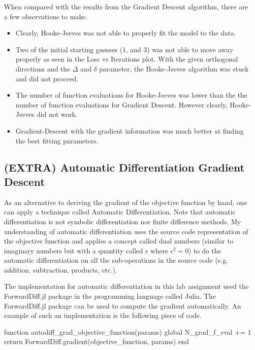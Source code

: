 \documentclass{article}
\begin{document}
    When compared with the results from the Gradient Descent algorithm, there are a few observations to make.
    \begin{itemize}
        \item Clearly, Hooke-Jeeves was not able to properly fit the model to the data.
        \item Two of the initial starting guesses (1, and 3) was not able to move away properly as seen in the Loss vs Iterations plot. With the given orthogonal directions and the $\Delta$ and $\delta$ parameter, the Hooke-Jeeves algorithm was stuck and did not proceed.
        \item The number of function evaluations for Hooke-Jeeves was lower than the the number of function evaluations for Gradient Descent. However clearly, Hooke-Jeeves did not work.
        \item Gradient-Descent with the gradient information was much better at finding the best fitting parameters.
    \end{itemize}

    \subsection{(EXTRA) Automatic Differentiation Gradient Descent}

    As an alternative to deriving the gradient of the objective function by hand, one can apply a technique called Automatic Differentiation. Note that automatic differentiation is not symbolic differentiation nor finite difference methods. My understanding of automatic differentiation uses the source code representation of the objective function and applies a concept called dual numbers (similar to imaginary numbers but with a quantity called $\epsilon$ where $\epsilon^2 = 0$) to do the automatic differentiation on all the sub-operations in the source code (e.g. addition, subtraction, products, etc.).

    The implementation for automatic differentiation in this lab assignment used the ForwardDiff.jl package in the programming language called Julia. The ForwardDiff.jl package can be used to compute the gradient automatically. An example of such an implementation is the following piece of code.

    \begin{jllisting}
        function autodiff_grad_objective_function(params)
            global N_grad_f_eval += 1
            return ForwardDiff.gradient(objective_function, params)
        end
    \end{jllisting}
\end{document}
